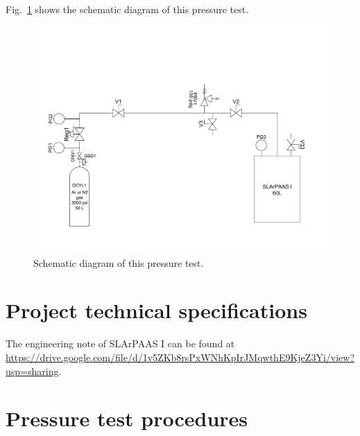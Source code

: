 \documentclass[letterpaper,11pt]{article}
\begin{document}
Fig.~\ref{fig:PressureTest_PID} shows the schematic diagram of this pressure test.

\begin{figure}[h]
    \centering
    \includegraphics[width=\textwidth]{drawing/PressureTestPID-Model.pdf}
    \caption{Schematic diagram of this pressure test.}
    \label{fig:PressureTest_PID}
\end{figure}

\section{Project technical specifications}

The engineering note of SLArPAAS I can be found at \\
\url{https://drive.google.com/file/d/1v5ZKb8rsPxWNhKpIrJMqwthE9KjeZ3Yi/view?usp=sharing}.

\section{Pressure test procedures}
\end{document}

